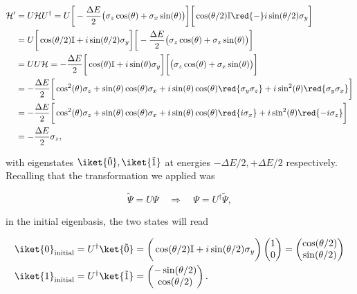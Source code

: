   \begin{equation}\label{uniRot}
  	\begin{aligned}
	  	\mathcal{H}' & = U\mathcal{H}U^{\dagger} = U \bigg[-\frac{\Delta E}{2}\big(\sigma_z\cos(\theta)+\sigma_x\sin(\theta)\big)\bigg]\bigg[\cos(\theta/2)\mathbb{I}\red{-}i\sin(\theta/2)\sigma_y\bigg]\\
	  	& = U \bigg[\cos(\theta/2)\mathbb{I}+i\sin(\theta/2)\sigma_y\bigg]\bigg[-\frac{\Delta E}{2}\big(\sigma_z\cos(\theta)+\sigma_x\sin(\theta)\big)\bigg]\\
	  	& = UU\mathcal{H} =-\frac{\Delta E}{2} \bigg[\cos(\theta)\mathbb{I}+i\sin(\theta)\sigma_y\bigg]\bigg[\big(\sigma_z\cos(\theta)+\sigma_x\sin(\theta)\big)\bigg]\\
	  	& = -\frac{\Delta E}{2}\bigg[\cos^2(\theta)\sigma_z+\sin(\theta)\cos(\theta)\sigma_x+i\sin(\theta)\cos(\theta)\red{\sigma_y\sigma_z}+i\sin^2(\theta)\red{\sigma_y\sigma_x}\bigg]\\
	  	& = -\frac{\Delta E}{2}\bigg[\cos^2(\theta)\sigma_z+\sin(\theta)\cos(\theta)\sigma_x+i\sin(\theta)\cos(\theta)\red{i\sigma_x}+i\sin^2(\theta)\red{-i\sigma_z}\bigg]\\
	  	& = -\frac{\Delta E}{2}\sigma_z,
  	\end{aligned}
  \end{equation}
  
  
  \noindent with eigenstates  $ \iket{\tilde{0}}, \iket{\tilde{1}} $ at energies $ -\Delta E/2, +\Delta E/2 $ respectively. Recalling that the transformation we applied was
  
  \begin{equation}\label{uniTransform}
  	\tilde{\Psi} = U\Psi \quad\Rightarrow\quad \Psi = U^{\dagger}\tilde{\Psi},
  \end{equation}
  
  \noindent in the initial eigenbasis, the two states will read
  
  \begin{equation}\label{uniInitial}
  	\begin{aligned}
	  	\iket{0}_{\text{initial}} & = U^{\dagger}\ket{\tilde{0}} = \bigg(\cos(\theta/2)\mathbb{I}+i\sin(\theta/2)\sigma_y\bigg)\begin{pmatrix}
	  	1\\0
	  	\end{pmatrix} = \begin{pmatrix}
	  	\cos(\theta/2)\\\sin(\theta/2)
	  	\end{pmatrix} \\
	  		  	\iket{1}_{\text{initial}} & = U^{\dagger}\ket{\tilde{1}} = \begin{pmatrix}
	  	-\sin(\theta/2)\\\cos(\theta/2)
	  	\end{pmatrix}.
  	\end{aligned}
  \end{equation}
  

